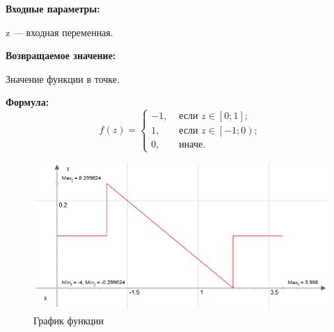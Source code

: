 \textbf{Входные параметры:}
 
z --- входная переменная.

\textbf{Возвращаемое значение:}
 
Значение функции в точке.

\textbf{Формула:}
\begin{equation*}
f\left(z \right)=\left\lbrace \begin{aligned} -1,& \text{ если } z \in \left[ 0; 1\right]   ; \\1,& \text{ если } z \in \left[ -1; 0\right) ; \\ 0,& \text{ иначе}. \end{aligned}\right.
\end{equation*}

 \begin{figure} [h] 
   \center
   \includegraphics {MHL_DerivativeOfBellShapedKernelParabola_Graph.png}
   \caption{График функции} 
   \label{img:MHL_DerivativeOfBellShapedKernelParabola_Graph}  
 \end{figure}